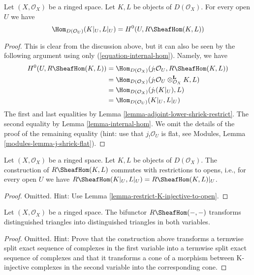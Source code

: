 \begin{lemma}
\label{lemma-section-RHom-over-U}
Let $(X, \mathcal{O}_X)$ be a ringed space. Let $K, L$ be objects
of $D(\mathcal{O}_X)$. For every open $U$ we have
$$
\Hom_{D(\mathcal{O}_U)}(K|_U, L|_U) =
H^0(U, R\SheafHom(K, L))
$$
\end{lemma}

\begin{proof}
This is clear from the discussion above, but it can also be seen by
the following argument using only (\ref{equation-internal-hom}).
Namely, we have
\begin{align*}
H^0(U, R\SheafHom(K, L))
& =
\Hom_{D(\mathcal{O}_X)}(j_!\mathcal{O}_U, R\SheafHom(K, L)) \\
& =
\Hom_{D(\mathcal{O}_X)}(
j_!\mathcal{O}_U \otimes_{\mathcal{O}_X}^\mathbf{L} K, L) \\
& =
\Hom_{D(\mathcal{O}_X)}(j_!(K|_U), L) \\
& =
\Hom_{D(\mathcal{O}_U)}(K|_U, L|_U)
\end{align*}
The first and last equalities by
Lemma \ref{lemma-adjoint-lower-shriek-restrict}.
The second equality by Lemma \ref{lemma-internal-hom}.
We omit the details of the proof of the remaining equality
(hint: use that $j_!\mathcal{O}_U$ is flat, see
Modules, Lemma \ref{modules-lemma-j-shriek-flat}).
\end{proof}

\begin{lemma}
\label{lemma-restriction-RHom-to-U}
Let $(X, \mathcal{O}_X)$ be a ringed space. Let $K, L$ be objects
of $D(\mathcal{O}_X)$. The construction of $R\SheafHom(K, L)$
commutes with restrictions to opens, i.e.,
for every open $U$ we have
$R\SheafHom(K|_U, L|_U) = R\SheafHom(K, L)|_U$.
\end{lemma}

\begin{proof}
Omitted. Hint: Use Lemma \ref{lemma-restrict-K-injective-to-open}.
\end{proof}

\begin{lemma}
\label{lemma-RHom-triagulated}
Let $(X, \mathcal{O}_X)$ be a ringed space. The bifunctor $R\SheafHom(- , -)$
transforms distinguished triangles into distinguished triangles in both
variables.
\end{lemma}

\begin{proof}
Omitted. Hint: Prove that the construction above transforms a termwise
split exact sequence of complexes in the first variable into a termwise
split exact sequence of complexes and that it transforms a cone of a
morphism between K-injective complexes in the second variable into the
corresponding cone.
\end{proof}

